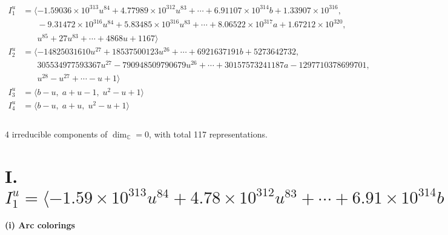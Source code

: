 \documentclass[1p]{elsarticle_modified}
\theoremstyle{definition}
\begin{document}
\begin{align*}
I^u_{1}&=\langle 
-1.59036\times10^{313} u^{84}+4.77989\times10^{312} u^{83}+\cdots+6.91107\times10^{314} b+1.33907\times10^{316},\\
\phantom{I^u_{1}}&\phantom{= \langle  }-9.31472\times10^{316} u^{84}+5.83485\times10^{316} u^{83}+\cdots+8.06522\times10^{317} a+1.67212\times10^{320},\\
\phantom{I^u_{1}}&\phantom{= \langle  }u^{85}+27 u^{83}+\cdots+4868 u+1167\rangle \\
I^u_{2}&=\langle 
-14825031610 u^{27}+18537500123 u^{26}+\cdots+6921637191 b+5273642732,\\
\phantom{I^u_{2}}&\phantom{= \langle  }305534977593367 u^{27}-790948509790679 u^{26}+\cdots+30157573241187 a-1297710378699701,\\
\phantom{I^u_{2}}&\phantom{= \langle  }u^{28}- u^{27}+\cdots- u+1\rangle \\
I^u_{3}&=\langle 
b- u,\;a+u-1,\;u^2- u+1\rangle \\
I^u_{4}&=\langle 
b- u,\;a+u,\;u^2- u+1\rangle \\
\\
\end{align*}
\raggedright * 4 irreducible components of $\dim_{\mathbb{C}}=0$, with total 117 representations.\\
\newpage
\renewcommand{\arraystretch}{1}
\centering \section*{I. $I^u_{1}= \langle -1.59\times10^{313} u^{84}+4.78\times10^{312} u^{83}+\cdots+6.91\times10^{314} b+1.34\times10^{316},\;-9.31\times10^{316} u^{84}+5.83\times10^{316} u^{83}+\cdots+8.07\times10^{317} a+1.67\times10^{320},\;u^{85}+27 u^{83}+\cdots+4868 u+1167 \rangle$}
\flushleft \textbf{(i) Arc colorings}\\
\end{document}
